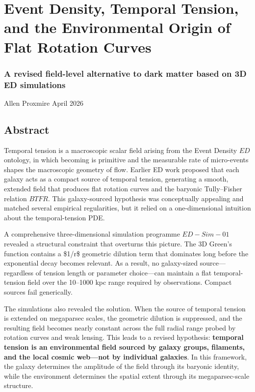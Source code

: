 \section{Event Density, Temporal Tension, and the Environmental Origin
of Flat Rotation
Curves}\label{event-density-temporal-tension-and-the-environmental-origin-of-flat-rotation-curves}

\subsubsection{A revised field-level alternative to dark matter based on
3D ED
simulations}\label{a-revised-field-level-alternative-to-dark-matter-based-on-3d-ed-simulations}

Allen Proxmire April 2026

\subsection{Abstract}\label{abstract}

Temporal tension is a macroscopic scalar field arising from the Event
Density \(ED\) ontology, in which becoming is primitive and the
measurable rate of micro-events shapes the macroscopic geometry of flow.
Earlier ED work proposed that each galaxy acts as a compact source of
temporal tension, generating a smooth, extended field that produces flat
rotation curves and the baryonic Tully--Fisher relation \(BTFR\). This
galaxy-sourced hypothesis was conceptually appealing and matched several
empirical regularities, but it relied on a one-dimensional intuition
about the temporal-tension PDE.

A comprehensive three-dimensional simulation programme \(ED-Sim-01\)
revealed a structural constraint that overturns this picture. The 3D
Green's function contains a \$1/r\$ geometric dilution term that
dominates long before the exponential decay becomes relevant. As a
result, no galaxy-sized source---regardless of tension length or
parameter choice---can maintain a flat temporal-tension field over the
10--1000 kpc range required by observations. Compact sources fail
generically.

The simulations also revealed the solution. When the source of temporal
tension is extended on megaparsec scales, the geometric dilution is
suppressed, and the resulting field becomes nearly constant across the
full radial range probed by rotation curves and weak lensing. This leads
to a revised hypothesis: \textbf{temporal tension is an environmental
field sourced by galaxy groups, filaments, and the local cosmic
web---not by individual galaxies}. In this framework, the galaxy
determines the amplitude of the field through its baryonic identity,
while the environment determines the spatial extent through its
megaparsec-scale structure.

